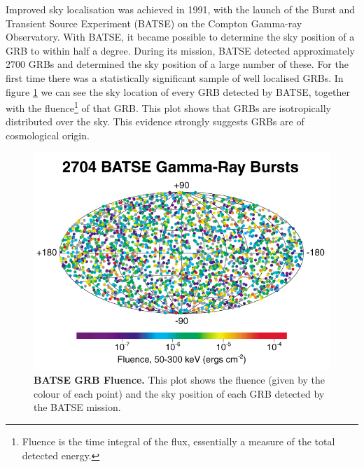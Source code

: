 \documentclass[11pt]{cuthesis}
\begin{document}
Improved sky localisation was achieved in 1991, with the launch of the Burst and Transient Source Experiment (BATSE) on the Compton Gamma-ray Observatory. With BATSE, it became possible to determine the sky position of a GRB to within half a degree. During its mission, BATSE detected approximately 2700 GRBs and determined the sky position of a large number of these. For the first time there was a statistically significant sample of well localised GRBs. In figure \ref{fig:batse grb fluence} we can see the sky location of every GRB detected by BATSE, together with the fluence\footnote{Fluence is the time integral of the flux, essentially a measure of the total detected energy.} of that GRB. This plot shows that GRBs are isotropically distributed over the sky. This evidence strongly suggests GRBs are of cosmological origin. 


\begin{figure} %
\begin{center}
\includegraphics[width=0.8\linewidth]{batse_grbs_fluence.jpg}
\end{center}
\caption{\textbf{BATSE GRB Fluence.} This plot shows the fluence (given by the colour of each point) and the sky position of each GRB detected by the BATSE mission. \cite{BATSE_dist} }
\label{fig:batse grb fluence}
\end{figure}
\end{document}
